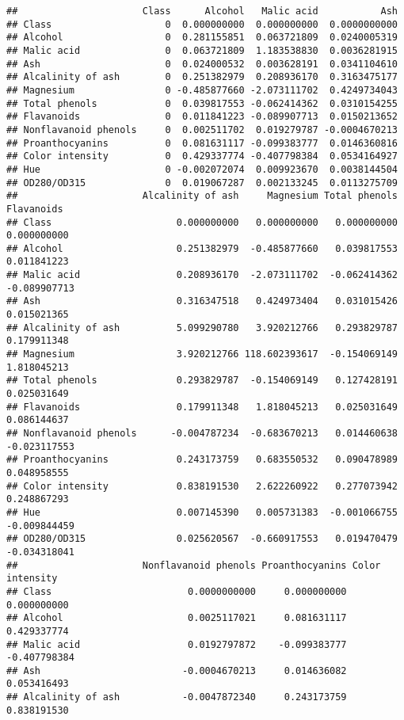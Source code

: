 \documentclass[
]{article}
\begin{document}
\begin{verbatim}
##                      Class      Alcohol   Malic acid           Ash
## Class                    0  0.000000000  0.000000000  0.0000000000
## Alcohol                  0  0.281155851  0.063721809  0.0240005319
## Malic acid               0  0.063721809  1.183538830  0.0036281915
## Ash                      0  0.024000532  0.003628191  0.0341104610
## Alcalinity of ash        0  0.251382979  0.208936170  0.3163475177
## Magnesium                0 -0.485877660 -2.073111702  0.4249734043
## Total phenols            0  0.039817553 -0.062414362  0.0310154255
## Flavanoids               0  0.011841223 -0.089907713  0.0150213652
## Nonflavanoid phenols     0  0.002511702  0.019279787 -0.0004670213
## Proanthocyanins          0  0.081631117 -0.099383777  0.0146360816
## Color intensity          0  0.429337774 -0.407798384  0.0534164927
## Hue                      0 -0.002072074  0.009923670  0.0038144504
## OD280/OD315              0  0.019067287  0.002133245  0.0113275709
##                      Alcalinity of ash     Magnesium Total phenols   Flavanoids
## Class                      0.000000000   0.000000000   0.000000000  0.000000000
## Alcohol                    0.251382979  -0.485877660   0.039817553  0.011841223
## Malic acid                 0.208936170  -2.073111702  -0.062414362 -0.089907713
## Ash                        0.316347518   0.424973404   0.031015426  0.015021365
## Alcalinity of ash          5.099290780   3.920212766   0.293829787  0.179911348
## Magnesium                  3.920212766 118.602393617  -0.154069149  1.818045213
## Total phenols              0.293829787  -0.154069149   0.127428191  0.025031649
## Flavanoids                 0.179911348   1.818045213   0.025031649  0.086144637
## Nonflavanoid phenols      -0.004787234  -0.683670213   0.014460638 -0.023117553
## Proanthocyanins            0.243173759   0.683550532   0.090478989  0.048958555
## Color intensity            0.838191530   2.622260922   0.277073942  0.248867293
## Hue                        0.007145390   0.005731383  -0.001066755 -0.009844459
## OD280/OD315                0.025620567  -0.660917553   0.019470479 -0.034318041
##                      Nonflavanoid phenols Proanthocyanins Color intensity
## Class                        0.0000000000     0.000000000     0.000000000
## Alcohol                      0.0025117021     0.081631117     0.429337774
## Malic acid                   0.0192797872    -0.099383777    -0.407798384
## Ash                         -0.0004670213     0.014636082     0.053416493
## Alcalinity of ash           -0.0047872340     0.243173759     0.838191530

\end{verbatim}
\end{document}
